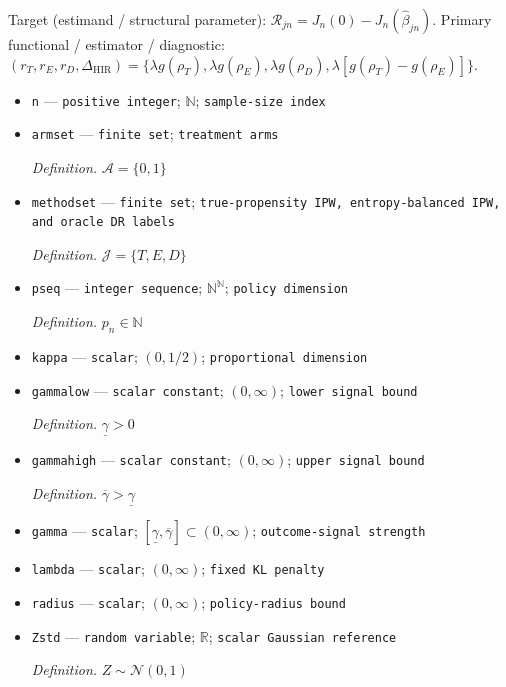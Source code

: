 \documentclass{article}
\begin{document}
Target (estimand / structural parameter): \(\mathcal R_{jn}=J_n(0)-J_n(\widehat\beta_{jn})\).
Primary functional / estimator / diagnostic: \((r_T,r_E,r_D,\Delta_{\mathrm{HIR}})=\{\lambda g(\rho_T),\lambda g(\rho_E),\lambda g(\rho_D),\lambda[g(\rho_T)-g(\rho_E)]\}\).
\begin{itemize}
  \item \texttt{n} --- \texttt{positive integer}; \(\mathbb N\); \texttt{sample-\allowbreak{}size index}
  \item \texttt{armset} --- \texttt{finite set}; \texttt{treatment arms}
  \par\smallskip\noindent\emph{Definition.} \(\mathcal A=\{0,1\}\)
  \item \texttt{methodset} --- \texttt{finite set}; \texttt{true-\allowbreak{}propensity IPW,\allowbreak{} entropy-\allowbreak{}balanced IPW,\allowbreak{} and oracle DR labels}
  \par\smallskip\noindent\emph{Definition.} \(\mathcal J=\{T,E,D\}\)
  \item \texttt{pseq} --- \texttt{integer sequence}; \(\mathbb N^{\mathbb N}\); \texttt{policy dimension}
  \par\smallskip\noindent\emph{Definition.} \(p_n\in\mathbb N\)
  \item \texttt{kappa} --- \texttt{scalar}; \((0,1/2)\); \texttt{proportional dimension}
  \item \texttt{gammalow} --- \texttt{scalar constant}; \((0,\infty)\); \texttt{lower signal bound}
  \par\smallskip\noindent\emph{Definition.} \(\underline\gamma>0\)
  \item \texttt{gammahigh} --- \texttt{scalar constant}; \((0,\infty)\); \texttt{upper signal bound}
  \par\smallskip\noindent\emph{Definition.} \(\overline\gamma>\underline\gamma\)
  \item \texttt{gamma} --- \texttt{scalar}; \([\underline\gamma,\overline\gamma]\subset(0,\infty)\); \texttt{outcome-\allowbreak{}signal strength}
  \item \texttt{lambda} --- \texttt{scalar}; \((0,\infty)\); \texttt{fixed KL penalty}
  \item \texttt{radius} --- \texttt{scalar}; \((0,\infty)\); \texttt{policy-\allowbreak{}radius bound}
  \item \texttt{Zstd} --- \texttt{random variable}; \(\mathbb R\); \texttt{scalar Gaussian reference}
  \par\smallskip\noindent\emph{Definition.} \(Z\sim\mathcal N(0,1)\)

\end{itemize}
\end{document}
